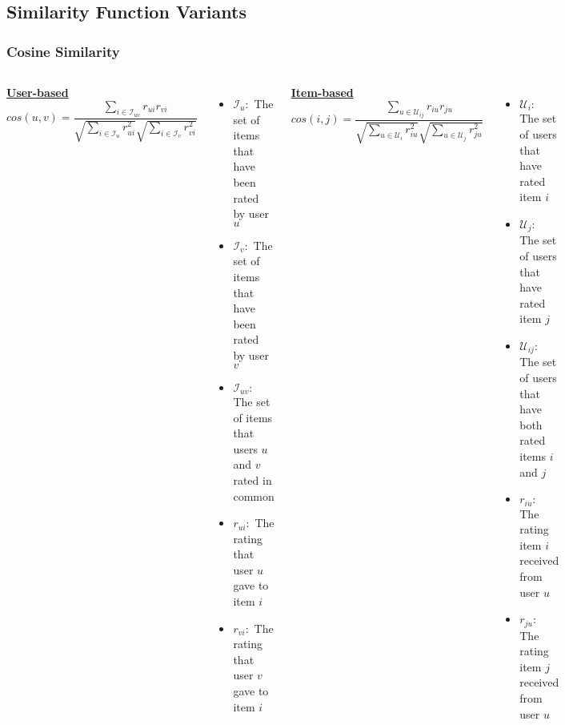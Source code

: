 \subsection{Similarity Function Variants}
\begin{frame}
    \frametitle{Cosine Similarity}
    \begin{columns}
        \centering
        \underline{\textbf{User-based}}
        \begin{equation*}
            cos(u,v) = \frac{\sum_{i \in \mathcal{I}_{uv}}r_{ui}r_{vi}}
        		    {\sqrt{\sum_{i \in \mathcal{I}_{u}}r_{ui}^2}
        		     \sqrt{\sum_{i \in \mathcal{I}_{v}}r_{vi}^2}}
        \end{equation*}
        \tiny
        \begin{itemize}
            \item $\mathcal{I}_{u}:$ The set of items that have been rated by user $u$
            \item $\mathcal{I}_{v}:$ The set of items that have been rated by user $v$
            \item $\mathcal{I}_{uv}:$ The set of items that users $u$ and $v$ rated in common
            \item $r_{ui}:$ The rating that user $u$ gave to item $i$
            \item $r_{vi}:$ The rating that user $v$ gave to item $i$
        \end{itemize}
        \centering
        \underline{\textbf{Item-based}}
        \begin{equation*}
            cos(i,j) = \frac{\sum_{u \in \mathcal{U}_{ij}}r_{iu}r_{ju}}
        		    {\sqrt{\sum_{u \in \mathcal{U}_{i}}r_{iu}^2}
        		     \sqrt{\sum_{u \in \mathcal{U}_{j}}r_{ju}^2}}
        \end{equation*}
        \tiny
        \begin{itemize}
            \item $\mathcal{U}_{i}:$ The set of users that have rated item $i$
            \item $\mathcal{U}_{j}:$ The set of users that have rated item $j$
            \item $\mathcal{U}_{ij}:$ The set of users that have both rated items $i$ and $j$
            \item $r_{iu}:$ The rating item $i$ received from user $u$
            \item $r_{ju}:$ The rating item $j$ received from user $u$
        \end{itemize}
    \end{columns}
\end{frame}
